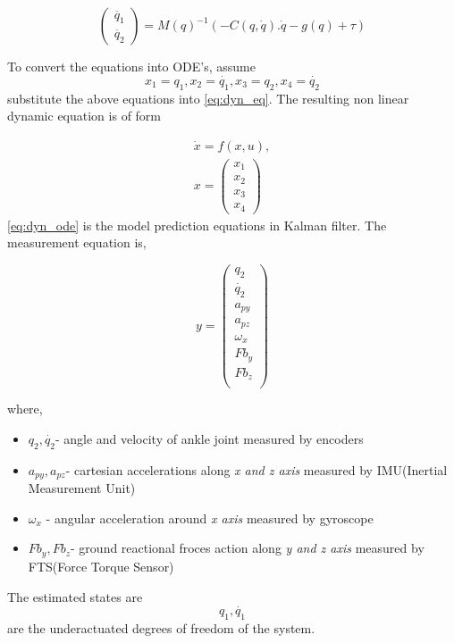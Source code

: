 \begin{equation}
	\label{eq:dyn_eq}
	\begin{pmatrix}
		\ddot{q_{1}} \\
		\ddot{q_{2}} 
		\end{pmatrix}
	= M(q)^{-1} \left( -C(q,\dot{q}).\dot{q} - g(q) + \tau \right )
\end{equation}

To convert the equations into ODE's, assume 
$$ x_1 = q_1, x_2 = \dot{q_1}, x_3 = q_2, x_4 = \dot{q_2}$$
substitute the above equations into \eqref{eq:dyn_eq}. The resulting non linear dynamic equation is of form

\begin{equation}
\begin{split}\label{eq:dyn_ode}
	\dot{x}  = f(x,u),	\\
	x = 
	\begin{pmatrix}
		x_1 \\
		x_2 \\
		x_3 \\
		x_4
	\end{pmatrix}
\end{split}
\end{equation}
\eqref{eq:dyn_ode} is the model prediction equations in Kalman filter. The measurement equation is,

\begin{equation}
	y= 
	\begin{pmatrix}
		q_2\\
		\dot{q_2}\\
		a_{py}\\
		a_{pz}\\
		\omega_x\\
		Fb_y\\
		Fb_z \\
	\end{pmatrix}
\end{equation}

where,
\begin{itemize}
\item
 $q_2, \dot{q_2}$- angle and velocity of ankle joint measured by encoders
\item 
$a_{py},a_{pz}$- cartesian accelerations along \emph{x and z axis} measured by IMU(Inertial Measurement Unit)
\item
$\omega_x$ - angular acceleration around \emph{x axis} measured by gyroscope
\item
$Fb_y,Fb_z$- ground reactional froces action along \emph{ y and z axis} measured by FTS(Force Torque Sensor)
\end{itemize}
The estimated states are $$q_1, \dot{q_1}$$ are the underactuated degrees of freedom of the system.

